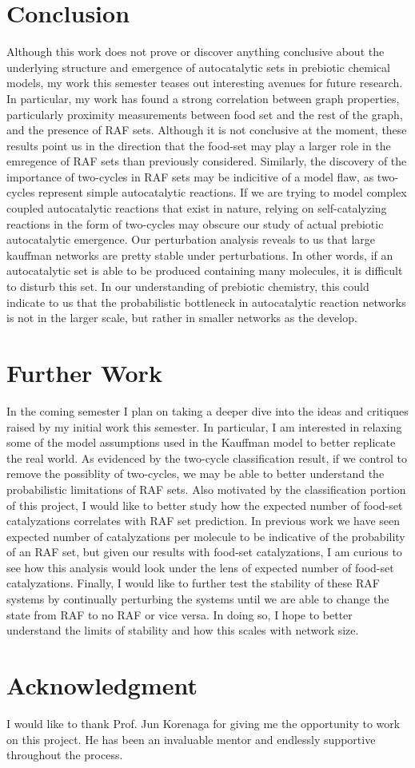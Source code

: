 \documentclass[11pt]{article}
\begin{document}
\section{Conclusion}

Although this work does not prove or discover anything conclusive about the underlying structure and emergence of autocatalytic sets in prebiotic chemical models, my work this semester teases out interesting avenues for future research.
In particular, my work has found a strong correlation between graph properties, particularly proximity measurements between food set and the rest of the graph, and the presence of RAF sets. 
Although it is not conclusive at the moment, these results point us in the direction that the food-set may play a larger role in the emregence of RAF sets than previously considered. 
Similarly, the discovery of the importance of two-cycles in RAF sets may be indicitive of a model flaw, as two-cycles represent simple autocatalytic reactions.
If we are trying to model complex coupled autocatalytic reactions that exist in nature, relying on self-catalyzing reactions in the form of two-cycles may obscure our study of actual prebiotic autocatalytic emergence. 
Our perturbation analysis reveals to us that large kauffman networks are pretty stable under perturbations. In other words, if an autocatalytic set is able to be produced containing many molecules, it is difficult to disturb this set. 
In our understanding of prebiotic chemistry, this could indicate to us that the probabilistic bottleneck in autocatalytic reaction networks is not in the larger scale, but rather in smaller networks as the develop.



\section{Further Work}

In the coming semester I plan on taking a deeper dive into the ideas and critiques raised by my initial work this semester. 
In particular, I am interested in relaxing some of the model assumptions used in the Kauffman model to better replicate the real world.
As evidenced by the two-cycle classification result, if we control to remove the possiblity of two-cycles, we may be able to better understand the probabilistic limitations of RAF sets.
Also motivated by the classification portion of this project, I would like to better study how the expected number of food-set catalyzations correlates with RAF set prediction. 
In previous work we have seen expected number of catalyzations per molecule to be indicative of the probability of an RAF set, but given our results with food-set catalyzations, I am curious to see how this analysis would look under the lens of expected number of food-set catalyzations.
Finally, I would like to further test the stability of these RAF systems by continually perturbing the systems until we are able to change the state from RAF to no RAF or vice versa. 
In doing so, I hope to better understand the limits of stability and how this scales with network size.


\section{Acknowledgment}

I would like to thank Prof. Jun Korenaga for giving me the opportunity to work on this project. He has been an invaluable mentor and endlessly supportive throughout the process. 
\end{document}
